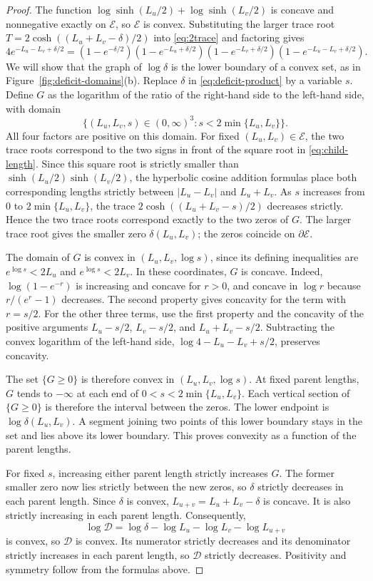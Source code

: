 \documentclass[10pt,twoside]{article}
\theoremstyle{plain}
\theoremstyle{definition}
\theoremstyle{remark}
\begin{document}
\begin{proof}
The function $\log\sinh(L_u/2)+\log\sinh(L_v/2)$ is concave
and nonnegative exactly on $\mathcal E$, so $\mathcal E$ is convex.
Substituting the larger trace root
$T=2\cosh((L_u+L_v-\delta)/2)$ into \eqref{eq:2trace}
and factoring gives
\begin{equation}
\label{eq:deficit-product}
4e^{-L_u-L_v+\delta/2}
=
(1-e^{-\delta/2})
(1-e^{-L_u+\delta/2})
(1-e^{-L_v+\delta/2})
(1-e^{-L_u-L_v+\delta/2}).
\end{equation}
We will show that the graph of $\log\delta$ is the lower boundary
of a convex set, as in Figure~\ref{fig:deficit-domains}(b).
Replace $\delta$ in \eqref{eq:deficit-product} by a variable $s$.
Define $G$ as the logarithm of the ratio of the right-hand side
to the left-hand side, with domain
$$
\{(L_u,L_v,s)\in(0,\infty)^3:s<2\min\{L_u,L_v\}\}.
$$
All four factors are positive on this domain.
For fixed $(L_u,L_v)\in\mathcal E$, the two trace roots correspond
to the two signs in front of the square root in
\eqref{eq:child-length}. Since this square root is strictly smaller
than $\sinh(L_u/2)\sinh(L_v/2)$, the hyperbolic cosine addition
formulas place both corresponding lengths strictly between
$|L_u-L_v|$ and $L_u+L_v$.
As $s$ increases from $0$ to $2\min\{L_u,L_v\}$, the trace
$2\cosh((L_u+L_v-s)/2)$ decreases strictly.
Hence the two trace roots correspond exactly to the two zeros
of $G$. The larger trace root gives the smaller zero
$\delta(L_u,L_v)$; the zeros coincide on $\partial\mathcal E$.

The domain of $G$ is convex in $(L_u,L_v,\log s)$, since
its defining inequalities are $e^{\log s}<2L_u$ and
$e^{\log s}<2L_v$. In these coordinates, $G$ is concave.
Indeed, $\log(1-e^{-r})$ is increasing and concave for $r>0$,
and concave in $\log r$ because $r/(e^r-1)$ decreases.
The second property gives concavity for the term with $r=s/2$.
For the other three terms, use the first property and the concavity
of the positive arguments $L_u-s/2$, $L_v-s/2$, and $L_u+L_v-s/2$.
Subtracting the convex logarithm of the left-hand side,
$\log4-L_u-L_v+s/2$, preserves concavity.

The set $\{G\geq0\}$ is therefore convex in $(L_u,L_v,\log s)$.
At fixed parent lengths, $G$ tends to $-\infty$ at each end of
$0<s<2\min\{L_u,L_v\}$. Each vertical section of $\{G\geq0\}$
is therefore the interval between the zeros. The lower endpoint
is $\log\delta(L_u,L_v)$. A segment joining two points of this
lower boundary stays in the set and lies above its lower boundary.
This proves convexity as a function of the parent lengths.

For fixed $s$, increasing either parent length strictly increases $G$.
The former smaller zero now lies strictly between the new zeros, so
$\delta$ strictly decreases in each parent length.
Since $\delta$ is convex, $L_{u+v}=L_u+L_v-\delta$ is concave.
It is also strictly increasing in each parent length. Consequently,
$$
\log\mathcal D
=\log\delta-\log L_u-\log L_v-\log L_{u+v}
$$
is convex, so $\mathcal D$ is convex.
Its numerator strictly decreases and its denominator strictly
increases in each parent length, so $\mathcal D$ strictly decreases.
Positivity and symmetry follow from the formulas above.
\end{proof}
\end{document}
